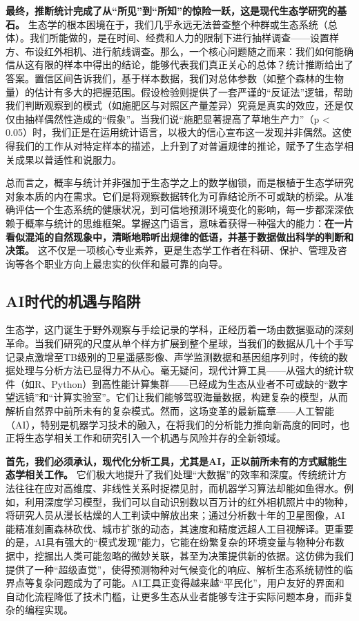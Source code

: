 \documentclass[
  twoside,12pt,fontset=none]{ctexbook}
\begin{document}
\textbf{最终，推断统计完成了从``所见''到``所知''的惊险一跃，这是现代生态学研究的基石。} 生态学的根本困境在于，我们几乎永远无法普查整个种群或生态系统（总体）。我们所能做的，是在时间、经费和人力的限制下进行抽样调查------设置样方、布设红外相机、进行航线调查。那么，一个核心问题随之而来：我们如何能确信从这有限的样本中得出的结论，能够代表我们真正关心的总体？统计推断给出了答案。置信区间告诉我们，基于样本数据，我们对总体参数（如整个森林的生物量）的估计有多大的把握范围。假设检验则提供了一套严谨的``反证法''逻辑，帮助我们判断观察到的模式（如施肥区与对照区产量差异）究竟是真实的效应，还是仅仅由抽样偶然性造成的``假象''。当我们说``施肥显著提高了草地生产力''（p \textless{} 0.05）时，我们正是在运用统计语言，以极大的信心宣布这一发现并非偶然。这使得我们的工作从对特定样本的描述，上升到了对普遍规律的推论，赋予了生态学相关成果以普适性和说服力。

总而言之，概率与统计并非强加于生态学之上的数学枷锁，而是根植于生态学研究对象本质的内在需求。它们是将观察数据转化为可靠结论所不可或缺的桥梁。从准确评估一个生态系统的健康状况，到可信地预测环境变化的影响，每一步都深深依赖于概率与统计的思维框架。掌握这门语言，意味着获得一种强大的能力：\textbf{在一片看似混沌的自然现象中，清晰地聆听出规律的低语，并基于数据做出科学的判断和决策。} 这不仅是一项核心专业素养，更是生态学工作者在科研、保护、管理及咨询等各个职业方向上最忠实的伙伴和最可靠的向导。

\hypertarget{aiux65f6ux4ee3ux7684ux673aux9047ux4e0eux9677ux9631}{%
\subsection{AI时代的机遇与陷阱}\label{aiux65f6ux4ee3ux7684ux673aux9047ux4e0eux9677ux9631}}

生态学，这门诞生于野外观察与手绘记录的学科，正经历着一场由数据驱动的深刻革命。当我们研究的尺度从单个样方扩展到整个星球，当我们的数据从几十个手写记录点激增至TB级别的卫星遥感影像、声学监测数据和基因组序列时，传统的数据处理与分析方法已显得力不从心。毫无疑问，现代计算工具------从强大的统计软件（如R、Python）到高性能计算集群------已经成为生态从业者不可或缺的``数字望远镜''和``计算实验室''。它们让我们能够驾驭海量数据，构建复杂的模型，从而解析自然界中前所未有的复杂模式。然而，这场变革的最新篇章------人工智能（AI），特别是机器学习技术的融入，在将我们的分析能力推向新高度的同时，也正将生态学相关工作和研究引入一个机遇与风险并存的全新领域。

\textbf{首先，我们必须承认，现代化分析工具，尤其是AI，正以前所未有的方式赋能生态学相关工作。} 它们极大地提升了我们处理``大数据''的效率和深度。传统统计方法往往在应对高维度、非线性关系时捉襟见肘，而机器学习算法却能如鱼得水。例如，利用深度学习模型，我们可以自动识别数以百万计的红外相机照片中的物种，将研究人员从漫长枯燥的人工判读中解放出来；通过分析数十年的卫星图像，AI能精准刻画森林砍伐、城市扩张的动态，其速度和精度远超人工目视解译。更重要的是，AI具有强大的``模式发现''能力，它能在纷繁复杂的环境变量与物种分布数据中，挖掘出人类可能忽略的微妙关联，甚至为决策提供新的依据。这仿佛为我们提供了一种``超级直觉''，使得预测物种对气候变化的响应、解析生态系统韧性的临界点等复杂问题成为了可能。AI工具正变得越来越``平民化''，用户友好的界面和自动化流程降低了技术门槛，让更多生态从业者能够专注于实际问题本身，而非复杂的编程实现。
\end{document}
